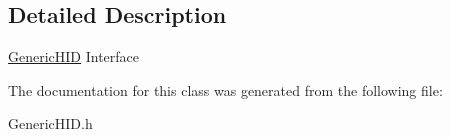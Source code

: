 \subsection{\-Detailed \-Description}
\hyperlink{classGenericHID}{\-Generic\-H\-I\-D} \-Interface 

\-The documentation for this class was generated from the following file\-:\begin{DoxyCompactItemize}
\item 
\-Generic\-H\-I\-D.\-h\end{DoxyCompactItemize}
